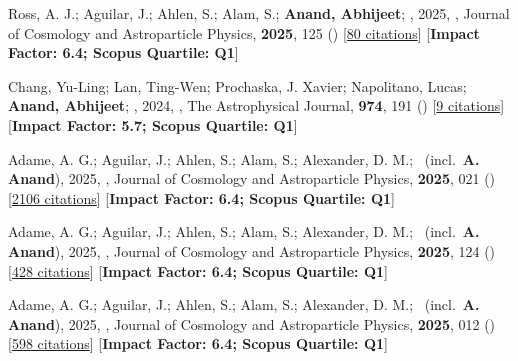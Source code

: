 \item[{\color{numcolor}\scriptsize12}] Ross, A. J.; Aguilar, J.; Ahlen, S.; Alam, S.; \textbf{Anand, Abhijeet}; \etal, 2025, , Journal of Cosmology and Astroparticle Physics, \textbf{2025}, 125 () [\href{https://ui.adsabs.harvard.edu/abs/2025JCAP...01..125R}{80 citations}] [\textbf{Impact Factor: 6.4; Scopus Quartile: Q1}]

\item[{\color{numcolor}\scriptsize11}] Chang, Yu-Ling; Lan, Ting-Wen; Prochaska, J. Xavier; Napolitano, Lucas; \textbf{Anand, Abhijeet}; \etal, 2024, , The Astrophysical Journal, \textbf{974}, 191 () [\href{https://ui.adsabs.harvard.edu/abs/2024ApJ...974..191C}{9 citations}] [\textbf{Impact Factor: 5.7; Scopus Quartile: Q1}]

\item[{\color{numcolor}\scriptsize10}] Adame, A. G.; Aguilar, J.; Ahlen, S.; Alam, S.; Alexander, D. M.; \etal\ (incl.\ \textbf{A. Anand}), 2025, , Journal of Cosmology and Astroparticle Physics, \textbf{2025}, 021 () [\href{https://ui.adsabs.harvard.edu/abs/2025JCAP...02..021A}{2106 citations}] [\textbf{Impact Factor: 6.4; Scopus Quartile: Q1}]

\item[{\color{numcolor}\scriptsize9}] Adame, A. G.; Aguilar, J.; Ahlen, S.; Alam, S.; Alexander, D. M.; \etal\ (incl.\ \textbf{A. Anand}), 2025, , Journal of Cosmology and Astroparticle Physics, \textbf{2025}, 124 () [\href{https://ui.adsabs.harvard.edu/abs/2025JCAP...01..124A}{428 citations}] [\textbf{Impact Factor: 6.4; Scopus Quartile: Q1}]

\item[{\color{numcolor}\scriptsize8}] Adame, A. G.; Aguilar, J.; Ahlen, S.; Alam, S.; Alexander, D. M.; \etal\ (incl.\ \textbf{A. Anand}), 2025, , Journal of Cosmology and Astroparticle Physics, \textbf{2025}, 012 () [\href{https://ui.adsabs.harvard.edu/abs/2025JCAP...04..012A}{598 citations}] [\textbf{Impact Factor: 6.4; Scopus Quartile: Q1}]

